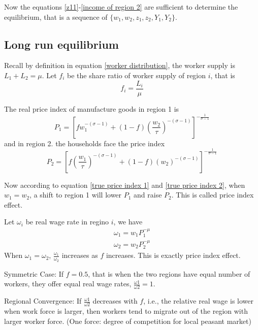 \documentclass{article}
\numberwithin{equation}{section} %
\begin{document}
Now the equations \ref{z11}-\ref{income of region 2} are sufficient to determine the equilibrium, that is a sequence of $\{w_1,w_2,z_1,z_2,Y_1,Y_2\}$.

\subsection{Long run equilibrium} %
\label{sub:long_run_equilibrium}

Recall by definition in equation \ref{worker distribution}, the worker supply is $L_1 +L_2 =\mu$. Let $f_i$ be the share ratio of worker supply of region $i$, that is 
\begin{equation}
  f_i = \frac{L_i}{\mu} \label{worker share ratio}
\end{equation}

The real price index of manufacture goods in region 1 is 
\begin{equation}
  P_1 = [f w_1^{-(\sigma-1)}+(1-f)(\frac{w_2}{\tau})^{-(\sigma-1)}]^{-\frac{1}{\sigma-1}} \label{true price index 1}
\end{equation}
and in region 2. the households face the price index
\begin{equation}
  P_2 = [f (\frac{w_1}{\tau})^{-(\sigma-1)}+(1-f)(w_2)^{-(\sigma-1)}]^{-\frac{1}{\sigma-1}} \label{true price index 2}
\end{equation}

Now according to equation \ref{true price index 1} and \ref{true price index 2}, when $w_1 =w_2 $, a shift to region 1 will lower $P_1$ and raise $P_2$. This is called price index effect.

Let $\omega_i$ be real wage rate in regino $i$, we have 
\begin{align}
\omega_1 = w_1 P_1^{-\mu}\\
\omega_2 = w_2 P_2^{-\mu}
\end{align}
When $\omega_1=\omega_2$, $\frac{\omega_1}{\omega_2}$ increases as $f$ increases. This is exactly price index effect.


Symmetric Case: If $f = 0.5$, that is when the two regions have equal number  of workers, they offer equal real wage rates, $\frac{\omega1}{\omega2} = 1$.

Regional Convergence: If $\frac{\omega1}{\omega2}$ decreases with $f$, i.e., the relative real wage is lower when work force is larger, then workers tend to migrate out of the region  with larger worker force. (One force: degree of competition for local peasant market)
\end{document}
